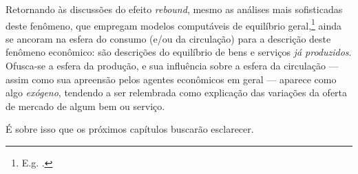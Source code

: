 Retornando às discussões do efeito \textit{rebound}, mesmo as análises mais sofisticadas deste fenômeno, que empregam modelos computáveis de equilíbrio geral,\footnote{E.g. \textcite{Hanley2009,Wei2010}.} ainda se ancoram na esfera do consumo (e/ou da circulação) para a descrição deste fenômeno econômico: são descrições do equilíbrio de bens e serviços \textit{já produzidos}. Ofusca-se a esfera da produção, e sua influência sobre a esfera da circulação --- assim como sua apreensão pelos agentes econômicos em geral --- aparece como algo \textit{exógeno}, tendendo a ser relembrada como explicação das variações da oferta de mercado de algum bem ou serviço. 

É sobre isso que os próximos capítulos buscarão esclarecer.





